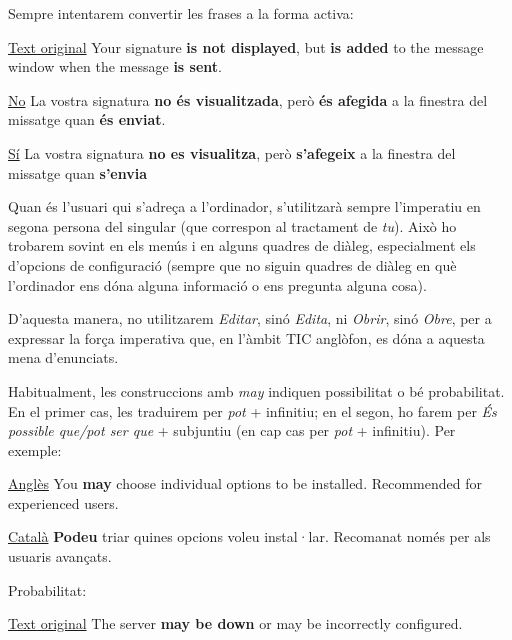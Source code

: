 \documentclass[9pt]{cheatsheet}
\begin{document}
\begin{multicols*}{3}



Sempre intentarem convertir les frases a la forma activa:

\underline {Text original} Your signature \textbf{is not displayed}, but \textbf{is added} to the message window when the message \textbf{is sent}.

\underline {No} La vostra signatura \textbf{no és visualitzada}, però \textbf{és afegida} a la finestra del missatge quan \textbf{és enviat}.

\underline {Sí} La vostra signatura \textbf{no es visualitza}, però \textbf{s'afegeix} a la finestra del missatge quan \textbf{s'envia}




Quan és l’usuari qui s'adreça a l'ordinador, s'utilitzarà sempre l’imperatiu en segona persona del singular (que correspon al tractament de \emph{tu}). Això ho trobarem sovint en els menús i en alguns quadres de diàleg, especialment els d’opcions de configuració (sempre que no siguin quadres de diàleg en què l’ordinador ens dóna alguna informació o ens pregunta alguna cosa).

D’aquesta manera, no utilitzarem \emph{Editar}, sinó \emph{Edita}, ni \emph{Obrir}, sinó \emph{Obre}, per a expressar la força imperativa que, en l’àmbit TIC anglòfon, es dóna a aquesta mena d’enunciats.



Habitualment, les construccions amb \emph{may} indiquen possibilitat o bé probabilitat. En el primer cas, les traduirem per \emph{pot} + infinitiu; en el segon, ho farem per \emph{És possible que/pot ser que} + subjuntiu (en cap cas per \emph{pot} + infinitiu). Per exemple:

\underline {Anglès} You \textbf{may} choose individual options to be installed. Recommended for experienced users.

\underline {Català} \textbf{Podeu} triar quines opcions voleu instal·lar. Recomanat només per als usuaris avançats.

Probabilitat:

\underline {Text original} The server \textbf{may be down} or may be incorrectly configured.


\end{multicols*}
\end{document}
